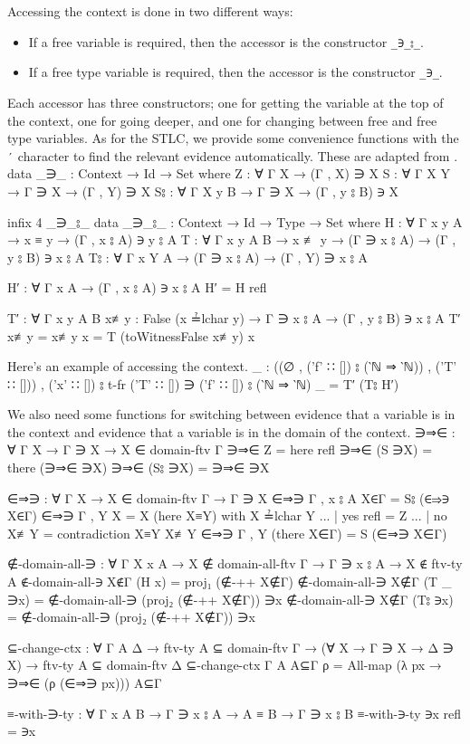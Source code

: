\documentclass[logo,bsc,singlespacing,parskip,online]{infthesis}
\renewenvironment{code}{\mintedcopy[breaklines,breaksymbolleft=\;]{agda}}{\endmintedcopy}
\begin{document}
Accessing the context is done in two different ways:
\begin{itemize}
  \item If a free variable is required, then the accessor is the constructor \texttt{\_∋\_⦂\_}.
  \item If a free type variable is required, then the accessor is the constructor \texttt{\_∋\_}.
\end{itemize}

Each accessor has three constructors; one for getting the variable at the top of the context, one
for going deeper, and one for changing between free and free type variables. As for the STLC, we
provide some convenience functions with the \texttt{′} character to find the relevant evidence
automatically. These are adapted from \citet[chapter~Lambda]{wadler_programming_2022}.
\begin{code}
  data _∋_ : Context → Id → Set where
    Z : ∀ {Γ X} → (Γ , X) ∋ X
    S : ∀ {Γ X Y} → Γ ∋ X → (Γ , Y) ∋ X
    S⦂ : ∀ {Γ X y B} → Γ ∋ X → (Γ , y ⦂ B) ∋ X

  infix 4 _∋_⦂_
  data _∋_⦂_ : Context → Id → Type → Set where
    H : ∀ {Γ x y A} → x ≡ y → (Γ , x ⦂ A) ∋ y ⦂ A
    T : ∀ {Γ x y A B}
      → x ≢ y → (Γ ∋ x ⦂ A) → (Γ , y ⦂ B) ∋ x ⦂ A
    T⦂ : ∀ {Γ x Y A} → (Γ ∋ x ⦂ A) → (Γ , Y) ∋ x ⦂ A

  H′ : ∀ {Γ x A} → (Γ , x ⦂ A) ∋ x ⦂ A
  H′ = H refl

  T′ : ∀ {Γ x y A B} {x≢y : False (x ≟lchar y)}
    → Γ ∋ x ⦂ A → (Γ , y ⦂ B) ∋ x ⦂ A
  T′ { x≢y = x≢y } x = T (toWitnessFalse x≢y) x
\end{code}

Here's an example of accessing the context.
\begin{code}
  _ : ((∅ , ('f' ∷ []) ⦂ (‵ℕ ⇒ ‵ℕ)) , ('T' ∷ []))
        , ('x' ∷ []) ⦂ t-fr ('T' ∷ [])
    ∋ ('f' ∷ []) ⦂ (‵ℕ ⇒ ‵ℕ)
  _ = T′ (T⦂ H′)
\end{code}

We also need some functions for switching between evidence that a variable is in the context and
evidence that a variable is in the domain of the context.
\begin{code}
  ∋⇒∈ : ∀ {Γ X} → Γ ∋ X → X ∈ domain-ftv Γ
  ∋⇒∈ Z = here refl
  ∋⇒∈ (S ∋X) = there (∋⇒∈ ∋X)
  ∋⇒∈ (S⦂ ∋X) = ∋⇒∈ ∋X

  ∈⇒∋ : ∀ {Γ X} → X ∈ domain-ftv Γ → Γ ∋ X
  ∈⇒∋ {Γ , x ⦂ A} X∈Γ = S⦂ (∈⇒∋ X∈Γ)
  ∈⇒∋ {Γ , Y} {X = X} (here X≡Y) with X ≟lchar Y
  ... | yes refl = Z
  ... | no  X≢Y  = contradiction X≡Y X≢Y
  ∈⇒∋ {Γ , Y} (there X∈Γ) = S (∈⇒∋ X∈Γ)

  ∉-domain-all-∋ : ∀ {Γ X x A} → X ∉ domain-all-ftv Γ → Γ ∋ x ⦂ A
    → X ∉ ftv-ty A
  ∉-domain-all-∋ X∉Γ (H x) = proj₁ (∉-++ X∉Γ)
  ∉-domain-all-∋ X∉Γ (T _ ∋x) =
    ∉-domain-all-∋ (proj₂ (∉-++ X∉Γ)) ∋x
  ∉-domain-all-∋ X∉Γ (T⦂ ∋x) =
    ∉-domain-all-∋ (proj₂ (∉-++ X∉Γ)) ∋x

  ⊆-change-ctx : ∀ {Γ A Δ} → ftv-ty A ⊆ domain-ftv Γ
    → (∀ {X} → Γ ∋ X → Δ ∋ X)
    → ftv-ty A ⊆ domain-ftv Δ
  ⊆-change-ctx {Γ} {A} A⊆Γ ρ =
    All-map (λ px → ∋⇒∈ (ρ (∈⇒∋ px))) A⊆Γ

  ≡-with-∋-ty : ∀ {Γ x A B} → Γ ∋ x ⦂ A → A ≡ B → Γ ∋ x ⦂ B
  ≡-with-∋-ty ∋x refl = ∋x
\end{code}
\end{document}
